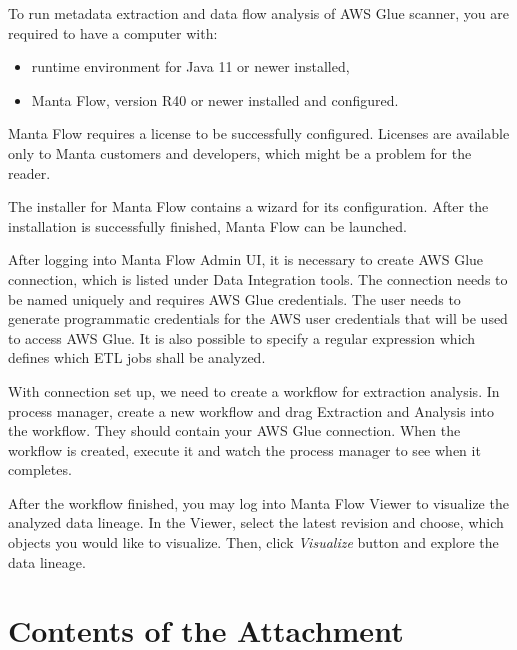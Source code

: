 \documentclass[12pt,a4paper]{report}
\begin{document}
To run metadata extraction and data flow analysis of AWS Glue scanner, you are required to have a computer with:
\begin{itemize}
    \item runtime environment for Java 11 or newer installed,
    \item Manta Flow, version R40 or newer installed and configured.
\end{itemize}
Manta Flow requires a license to be successfully configured. Licenses are available only to Manta customers and developers, which might be a problem for the reader.
\par
The installer for Manta Flow contains a wizard for its configuration. After the installation is successfully finished, Manta Flow can be launched.
\par
After logging into Manta Flow Admin UI, it is necessary to create AWS Glue connection, which is listed under Data Integration tools. The connection needs to be named uniquely and requires AWS Glue credentials. The user needs to generate programmatic credentials for the AWS user credentials that will be used to access AWS Glue. It is also possible to specify a regular expression which defines which ETL jobs shall be analyzed.
\par
With connection set up, we need to create a workflow for extraction analysis. In process manager, create a new workflow and drag Extraction and Analysis into the workflow. They should contain your AWS Glue connection. When the workflow is created, execute it and watch the process manager to see when it completes.
\par
After the workflow finished, you may log into Manta Flow Viewer to visualize the analyzed data lineage. In the Viewer, select the latest revision and choose, which objects you would like to visualize. Then, click \textit{Visualize} button and explore the data lineage.

\section{Contents of the Attachment}
\end{document}
